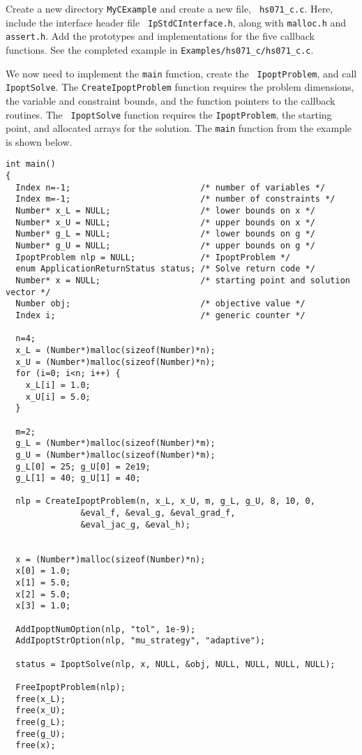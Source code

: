 \documentclass[letter,10pt]{article}
\begin{document}
{Create a new directory {\tt MyCExample} and create a new file, {\tt
hs071\_c.c}.  Here, include the interface header file {\tt
IpStdCInterface.h}, along with {\tt malloc.h} and {\tt assert.h}. Add
the prototypes and implementations for the five callback functions.
See the completed example in {\tt Examples/hs071\_c/hs071\_c.c}.

We now need to implement the {\tt main} function, create the {\tt
IpoptProblem}, and call {\tt IpoptSolve}. The {\tt CreateIpoptProblem}
function requires the problem dimensions, the variable and constraint
bounds, and the function pointers to the callback routines. The {\tt
IpoptSolve} function requires the {\tt IpoptProblem}, the starting
point, and allocated arrays for the solution.  The {\tt main} function
from the example is shown below.
\begin{verbatim}
int main()
{
  Index n=-1;                          /* number of variables */
  Index m=-1;                          /* number of constraints */
  Number* x_L = NULL;                  /* lower bounds on x */
  Number* x_U = NULL;                  /* upper bounds on x */
  Number* g_L = NULL;                  /* lower bounds on g */
  Number* g_U = NULL;                  /* upper bounds on g */
  IpoptProblem nlp = NULL;             /* IpoptProblem */
  enum ApplicationReturnStatus status; /* Solve return code */
  Number* x = NULL;                    /* starting point and solution vector */
  Number obj;                          /* objective value */
  Index i;                             /* generic counter */
  
  n=4;
  x_L = (Number*)malloc(sizeof(Number)*n);
  x_U = (Number*)malloc(sizeof(Number)*n);
  for (i=0; i<n; i++) {
    x_L[i] = 1.0;
    x_U[i] = 5.0;
  }

  m=2;
  g_L = (Number*)malloc(sizeof(Number)*m);
  g_U = (Number*)malloc(sizeof(Number)*m);
  g_L[0] = 25; g_U[0] = 2e19;
  g_L[1] = 40; g_U[1] = 40;

  nlp = CreateIpoptProblem(n, x_L, x_U, m, g_L, g_U, 8, 10, 0, 
			   &eval_f, &eval_g, &eval_grad_f, 
			   &eval_jac_g, &eval_h);
  
  
  x = (Number*)malloc(sizeof(Number)*n);
  x[0] = 1.0;
  x[1] = 5.0;
  x[2] = 5.0;
  x[3] = 1.0;

  AddIpoptNumOption(nlp, "tol", 1e-9);
  AddIpoptStrOption(nlp, "mu_strategy", "adaptive");

  status = IpoptSolve(nlp, x, NULL, &obj, NULL, NULL, NULL, NULL);
 
  FreeIpoptProblem(nlp);
  free(x_L);
  free(x_U);
  free(g_L);
  free(g_U);
  free(x);


\end{verbatim}}
\end{document}
